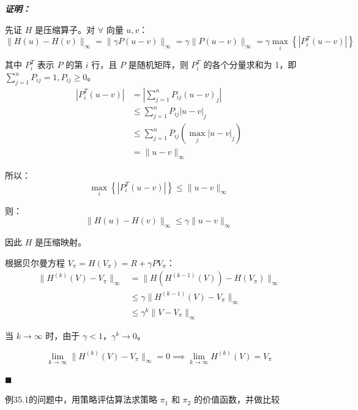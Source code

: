 \documentclass[12pt, a4paper]{article}
\renewenvironment{proof}{
	\par\vspace{0.2cm}\noindent\textbf{\color{themecolor} \textit{证明：}}
}{
	\hfill $\blacksquare$ \par\vspace{0.5cm} %
}
\begin{document}
	\begin{proof}
		先证 $H$ 是压缩算子。对 $\forall$ 向量 $u, v$：
		\[ 
		\|H(u) - H(v)\|_\infty 
		= \| \gamma P(u-v) \|_\infty 
		= \gamma \| P(u-v) \|_\infty 
		= \gamma \max_{i} \left\{ |P_i^T (u-v)| \right\} 
		\]
		
		其中 $P_i^T$ 表示 $P$ 的第 $i$ 行，且 $P$ 是随机矩阵，则 $P_i^T$ 的各个分量求和为 1，即 $\sum_{j=1}^n P_{ij} = 1, P_{ij} \ge 0$。
		\begin{align*}
			|P_i^T (u-v)| &= \left| \sum_{j=1}^n P_{ij} (u-v)_j \right| \\
			&\le \sum_{j=1}^n P_{ij} |u-v|_j \\
			&\le \sum_{j=1}^n P_{ij} (\max_j |u-v|_j) \\
			&= \| u-v \|_\infty
		\end{align*}
		
		所以：
		\[ \max_{i} \left\{ |P_i^T(u-v)| \right\} \le \| u-v \|_\infty \]
		
		则：
		\[ \| H(u) - H(v) \|_\infty \le \gamma \| u-v \|_\infty \]
		
		因此 $H$ 是压缩映射。
		
		根据贝尔曼方程 $V_{\pi} = H(V_{\pi}) = R + \gamma P V_{\pi}$：
		\begin{align*}
			\| H^{(k)}(V) - V_{\pi} \|_\infty 
			&= \| H(H^{(k-1)}(V)) - H(V_{\pi}) \|_\infty \\
			&\le \gamma \| H^{(k-1)}(V) - V_{\pi} \|_\infty \\
			&\le \gamma^k \| V - V_{\pi} \|_\infty
		\end{align*}
		
		当 $k \to \infty$ 时，由于 $\gamma < 1$，$\gamma^k \to 0$。
		
		\[ \lim_{k \to \infty} \| H^{(k)}(V) - V_{\pi} \|_\infty = 0 \implies \lim_{k \to \infty} H^{(k)}(V) = V_{\pi} \]
	\end{proof}
	
	\clearpage
	\begin{problem}[习题 35.6]
		例35.1的问题中，用策略评估算法求策略 $\pi_1$ 和 $\pi_2$ 的价值函数，并做比较
	\end{problem}
	
\end{document}
